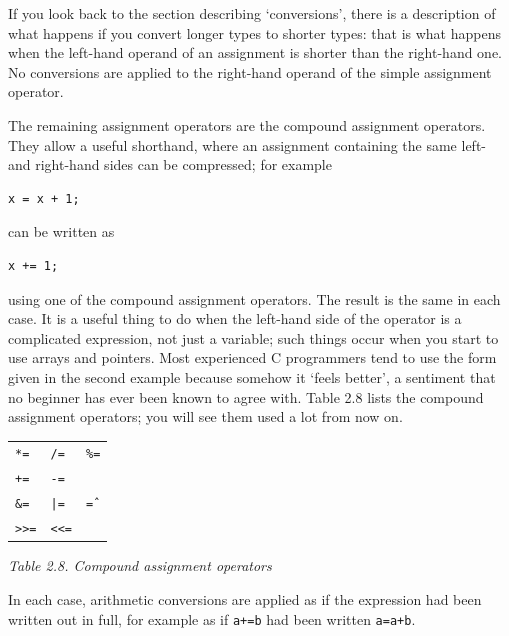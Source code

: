     If you look back to the section describing `conversions', there
     is a description of what happens if you convert longer types to shorter
     types: that is what happens when the left-hand operand of an assignment
     is shorter than the right-hand one. No conversions are applied to the
     right-hand operand of the simple assignment operator.


    The remaining assignment operators are the compound assignment
     operators. They allow a useful shorthand, where an assignment containing
     the same left- and right-hand sides can be compressed; for example


    \begin{Verbatim}
x = x + 1;
\end{Verbatim}

    can be written as


    \begin{Verbatim}
x += 1;
\end{Verbatim}

    using one of the compound assignment operators. The result is the same
     in each case. It is a useful thing to do when the left-hand side of the
     operator is a complicated expression, not just a variable; such things
     occur when you start to use arrays and pointers. Most experienced C
     programmers tend to use the form given in the second example because
     somehow it `feels better', a sentiment that no beginner has ever
     been known to agree with. Table 2.8 lists the compound
     assignment operators; you will see them used a lot from now on.


    \begin{tabular}{llp{\textwidth}}
      \texttt{*=} & \texttt{/=} & \texttt{\%=}
     \\

      \texttt{+=} & \texttt{-=} & 
     \\

      \texttt{\&=} & \texttt{|=} & \texttt{\^=}
     \\

      \texttt{>>=} & \texttt{<<=} & 
     \\
\end{tabular}

\begin{center}\textit{Table 2.8. Compound assignment operators}\end{center}


    In each case, arithmetic conversions are applied as if the expression
     had been written out in full, for example as if \texttt{a+=b}
     had been written \texttt{a=a+b}.


